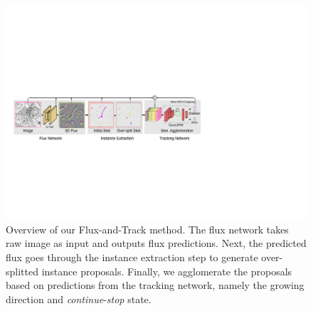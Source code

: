 \begin{figure}[htpb]
	\centering
	\includegraphics[width=\textwidth]{figures/model/architecture_0313.pdf}
	\caption{Overview of our Flux-and-Track method. The flux network takes raw image as input and outputs flux predictions. Next, the predicted flux goes through the instance extraction step to generate over-splitted instance proposals. Finally, we agglomerate the proposals based on predictions from the tracking network, namely the growing direction and \textit{continue}-\textit{stop} state. 
	}
	
	\label{fig:method_overview}
\end{figure}

